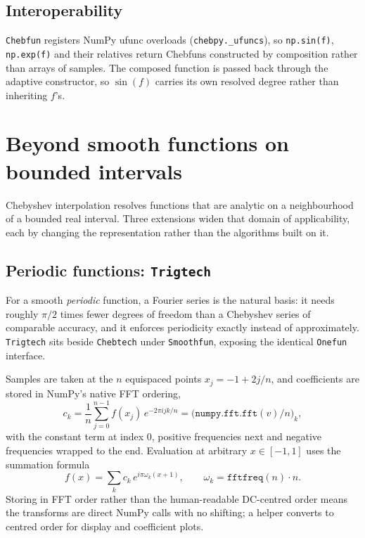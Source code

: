 \documentclass[11pt,a4paper]{article}
\newcommand{\code}[1]{\texttt{#1}}
\begin{document}
\subsection{Interoperability}

\code{Chebfun} registers NumPy ufunc overloads (\code{chebpy.\_ufuncs}), so
\code{np.sin(f)}, \code{np.exp(f)} and their relatives return Chebfuns
constructed by composition rather than arrays of samples. The composed function
is passed back through the adaptive constructor, so $\sin(f)$ carries its own
resolved degree rather than inheriting $f$'s.

\section{Beyond smooth functions on bounded intervals}
\label{sec:beyond}

Chebyshev interpolation resolves functions that are analytic on a
neighbourhood of a bounded real interval. Three extensions widen that domain of
applicability, each by changing the representation rather than the algorithms
built on it.

\subsection{Periodic functions: \texttt{Trigtech}}
\label{sec:trig}

For a smooth \emph{periodic} function, a Fourier series is the natural basis: it
needs roughly $\pi/2$ times fewer degrees of freedom than a Chebyshev series of
comparable accuracy, and it enforces periodicity exactly instead of
approximately. \code{Trigtech} sits beside \code{Chebtech} under
\code{Smoothfun}, exposing the identical \code{Onefun} interface.

Samples are taken at the $n$ equispaced points $x_j = -1 + 2j/n$, and
coefficients are stored in NumPy's native FFT ordering,
\begin{equation}
  c_k = \frac{1}{n} \sum_{j=0}^{n-1} f(x_j)\, e^{-2\pi i j k / n}
      = \bigl(\texttt{numpy.fft.fft}(v)/n\bigr)_k ,
  \label{eq:trigcoeffs}
\end{equation}
with the constant term at index $0$, positive frequencies next and negative
frequencies wrapped to the end. Evaluation at arbitrary $x \in [-1,1]$ uses the
summation formula
\begin{equation}
  f(x) = \sum_k c_k \, e^{i \pi \omega_k (x + 1)},
  \qquad \omega_k = \texttt{fftfreq}(n) \cdot n .
  \label{eq:trigeval}
\end{equation}
Storing in FFT order rather than the human-readable DC-centred order means the
transforms are direct NumPy calls with no shifting; a helper converts to
centred order for display and coefficient plots.
\end{document}
